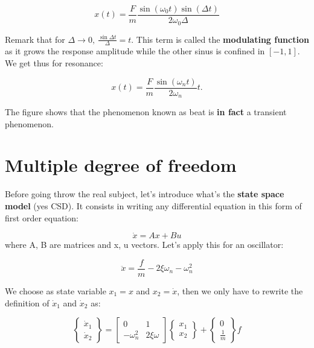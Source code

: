  				\begin{equation}
 				x(t) = \frac{F}{m} \frac{\sin (\omega _0t)\sin (\Delta t)}{2\omega _0 \Delta}
 				\end{equation}
 				
 				Remark that for $\Delta \rightarrow 0, \ \frac{\sin \Delta t}{\Delta} = t$. This term is called the \textbf{modulating function} as it grows the response amplitude while the other sinus is confined in $[-1,1]$. We get thus for resonance:
 				
 				\begin{equation}
 				x(t) = \frac{F}{m} \frac{\sin (\omega _nt)}{2\omega _n}	t.
				\end{equation} 				 
 				
 				The figure shows that the phenomenon known as beat is \textbf{in fact} a transient phenomenon. 
 				
 		\section{Multiple degree of freedom}
 			Before going throw the real subject, let's introduce what's the \textbf{state space model} (yes CSD). It consists in writing any differential equation in this form of first order equation:
 			
 			\begin{equation}
 			\dot{x} = A x+ Bu
 			\end{equation}
 			where A, B are matrices and x, u vectors. Let's apply this for an oscillator:
 			
 			\begin{equation}
 			\ddot{x} = \frac{f}{m} - 2\xi \omega _n - \omega _n^2 
 			\end{equation}
 			
 			We choose as state variable $x_1 = x$ and $x_2 = \dot{x}$, then we only have to rewrite the definition of $\dot{x}_1$ and $\dot{x}_2$ as:
 			
 			\begin{equation}
 			\left\{
 			\begin{array}{c}
 			\dot{x}_1\\
 			\dot{x}_2
 			\end{array}
 			\right\}
 			=
 			\left[
 			\begin{array}{cc}
 			0 & 1\\
 			-\omega _n ^2 & 2\xi \omega
 			\end{array}
 			\right]
 			\left\{
 			\begin{array}{c}
 			{x}_1\\
 			{x}_2
 			\end{array}
 			\right\}
 			+
 			\left\{
 			\begin{array}{c}
 			0\\
 			\frac{1}{m}
 			\end{array}
 			\right\}
 			f
 			\end{equation}
 			
